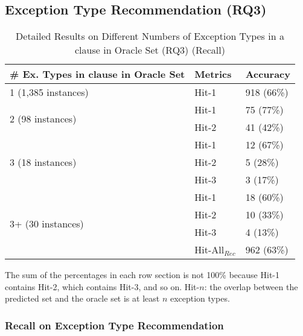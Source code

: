 \subsection{Exception Type Recommendation (RQ3)}
\label{sec:rq3}

\begin{table}[t]
  \caption{Detailed Results on Different Numbers of Exception Types in a
     clause in Oracle Set (RQ3) (Recall)}
  \vspace{-12pt}
	{\small
	  \begin{center}
            \tabcolsep 3.5pt
			\renewcommand{\arraystretch}{1}
			\begin{tabular}{p{4.5cm}<{\centering}|p{1.3cm}<{\centering}|p{1.5cm}<{\centering}}
				\hline
				\# Ex. Types in \code{catch} clause in Oracle Set & Metrics &  Accuracy\\
				\hline
				\multirow{1}{*}{1 (1,385 instances)}   & Hit-1  & 918 (66\%) \\
				\hline
				\multirow{2}{*}{2 (98 instances)}  & Hit-1   & 75 (77\%) \\
				& Hit-2         &  41 (42\%) \\
				\hline
				\multirow{3}{*}{3 (18 instances)}  & Hit-1    & 12 (67\%) \\
				& Hit-2     & 5 (28\%)\\
				& Hit-3     & 3 (17\%) \\
				\hline
				\multirow{4}{*}{3+ (30 instances)}  & Hit-1   & 18 (60\%) \\
				& Hit-2     & 10 (33\%) \\
				& Hit-3     & 4 (13\%)\\
                                \hline
                                & Hit-All$_{Rec}$ & 962 (63\%)\\
				\hline
			\end{tabular}
	                The sum of the percentages in each row section is not 100\% because Hit-1 contains Hit-2, which contains Hit-3, and so on. Hit-$n$: the overlap between the predicted set and the oracle set is at least $n$ exception types.
			\label{tab:recall-3}
		\end{center}
	}
\end{table}

\subsubsection{{\bf Recall on Exception Type Recommendation}}
\label{sec:req3-recall}

